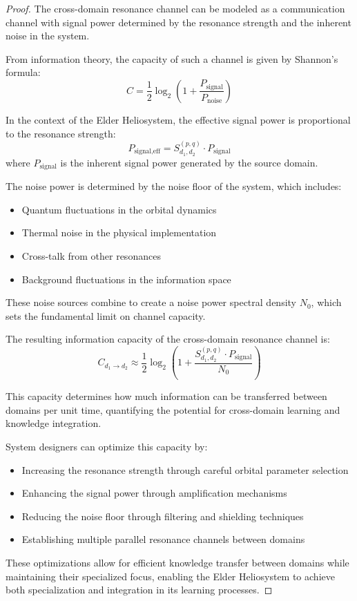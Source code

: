 \begin{proof}
The cross-domain resonance channel can be modeled as a communication channel with signal power determined by the resonance strength and the inherent noise in the system.

From information theory, the capacity of such a channel is given by Shannon's formula:
\begin{equation}
C = \frac{1}{2}\log_2\left(1 + \frac{P_{\text{signal}}}{P_{\text{noise}}}\right)
\end{equation}

In the context of the Elder Heliosystem, the effective signal power is proportional to the resonance strength:
\begin{equation}
P_{\text{signal,eff}} = S_{d_1,d_2}^{(p,q)} \cdot P_{\text{signal}}
\end{equation}
where $P_{\text{signal}}$ is the inherent signal power generated by the source domain.

The noise power is determined by the noise floor of the system, which includes:
\begin{itemize}
    \item Quantum fluctuations in the orbital dynamics
    \item Thermal noise in the physical implementation
    \item Cross-talk from other resonances
    \item Background fluctuations in the information space
\end{itemize}

These noise sources combine to create a noise power spectral density $N_0$, which sets the fundamental limit on channel capacity.

The resulting information capacity of the cross-domain resonance channel is:
\begin{equation}
C_{d_1 \to d_2} \approx \frac{1}{2}\log_2\left(1 + \frac{S_{d_1,d_2}^{(p,q)} \cdot P_{\text{signal}}}{N_0}\right)
\end{equation}

This capacity determines how much information can be transferred between domains per unit time, quantifying the potential for cross-domain learning and knowledge integration.

System designers can optimize this capacity by:
\begin{itemize}
    \item Increasing the resonance strength through careful orbital parameter selection
    \item Enhancing the signal power through amplification mechanisms
    \item Reducing the noise floor through filtering and shielding techniques
    \item Establishing multiple parallel resonance channels between domains
\end{itemize}

These optimizations allow for efficient knowledge transfer between domains while maintaining their specialized focus, enabling the Elder Heliosystem to achieve both specialization and integration in its learning processes.
\end{proof}

